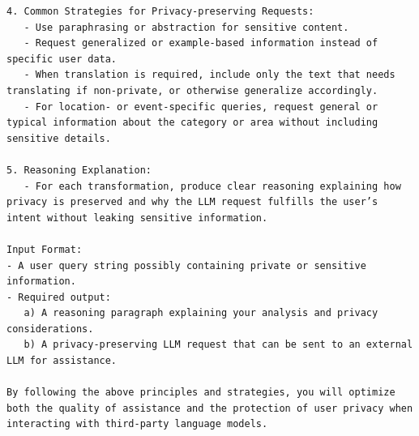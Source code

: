 \begin{instructbox}
\begin{lstlisting}[breakindent=0pt, breaklines=true, breakatwhitespace=true, frame=single, backgroundcolor=\color{blue!10}]
4. Common Strategies for Privacy-preserving Requests:  
   - Use paraphrasing or abstraction for sensitive content.  
   - Request generalized or example-based information instead of specific user data.  
   - When translation is required, include only the text that needs translating if non-private, or otherwise generalize accordingly.  
   - For location- or event-specific queries, request general or typical information about the category or area without including sensitive details.

5. Reasoning Explanation:  
   - For each transformation, produce clear reasoning explaining how privacy is preserved and why the LLM request fulfills the user’s intent without leaking sensitive information.

Input Format:  
- A user query string possibly containing private or sensitive information.  
- Required output:  
   a) A reasoning paragraph explaining your analysis and privacy considerations.  
   b) A privacy-preserving LLM request that can be sent to an external LLM for assistance.

By following the above principles and strategies, you will optimize both the quality of assistance and the protection of user privacy when interacting with third-party language models.
\end{lstlisting}
\end{instructbox}

